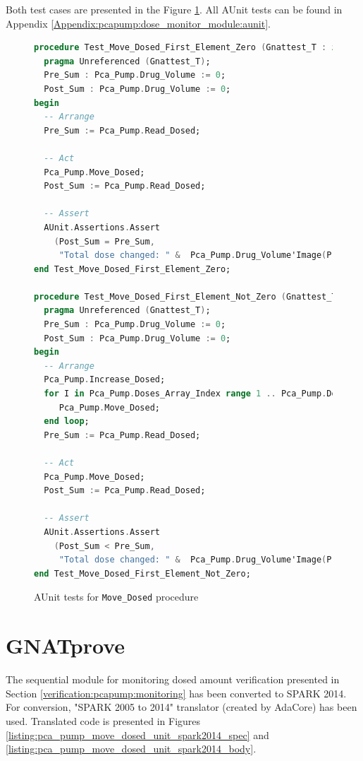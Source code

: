 Both test cases are presented in the Figure \ref{listing:pca_pump_move_dosed_unit_tests}. All AUnit tests can be found in Appendix \ref{Appendix:pcapump:dose_monitor_module:aunit}.

\begin{figure}
\singlespacing
\begin{lstlisting}[language=ada, frame=single, gobble=0]
procedure Test_Move_Dosed_First_Element_Zero (Gnattest_T : in out Test) is
  pragma Unreferenced (Gnattest_T);
  Pre_Sum : Pca_Pump.Drug_Volume := 0;
  Post_Sum : Pca_Pump.Drug_Volume := 0;
begin
  -- Arrange
  Pre_Sum := Pca_Pump.Read_Dosed;

  -- Act
  Pca_Pump.Move_Dosed;
  Post_Sum := Pca_Pump.Read_Dosed;

  -- Assert
  AUnit.Assertions.Assert
    (Post_Sum = Pre_Sum,
     "Total dose changed: " &  Pca_Pump.Drug_Volume'Image(Pre_Sum) & " /= " &  Pca_Pump.Drug_Volume'Image(Post_Sum));
end Test_Move_Dosed_First_Element_Zero;

procedure Test_Move_Dosed_First_Element_Not_Zero (Gnattest_T : in out Test) is
  pragma Unreferenced (Gnattest_T);
  Pre_Sum : Pca_Pump.Drug_Volume := 0;
  Post_Sum : Pca_Pump.Drug_Volume := 0;
begin
  -- Arrange
  Pca_Pump.Increase_Dosed;
  for I in Pca_Pump.Doses_Array_Index range 1 .. Pca_Pump.Doses_Array_Index'Last-1 loop
     Pca_Pump.Move_Dosed;
  end loop;
  Pre_Sum := Pca_Pump.Read_Dosed;

  -- Act
  Pca_Pump.Move_Dosed;
  Post_Sum := Pca_Pump.Read_Dosed;

  -- Assert
  AUnit.Assertions.Assert
    (Post_Sum < Pre_Sum,
     "Total dose changed: " &  Pca_Pump.Drug_Volume'Image(Pre_Sum) & " should be greater than " &  Pca_Pump.Drug_Volume'Image(Post_Sum));
end Test_Move_Dosed_First_Element_Not_Zero;
\end{lstlisting}
\doublespacing
\caption{AUnit tests for \lstinline{Move_Dosed} procedure}
\label{listing:pca_pump_move_dosed_unit_tests}
\end{figure}


\section{GNATprove}
\label{verification:gnatprove}

The sequential module for monitoring dosed amount verification presented in Section \ref{verification:pcapump:monitoring} has been converted to SPARK 2014. For conversion, "SPARK 2005 to 2014" translator (created by AdaCore) has been used. Translated code is presented in Figures \ref{listing:pca_pump_move_dosed_unit_spark2014_spec} and \ref{listing:pca_pump_move_dosed_unit_spark2014_body}.

